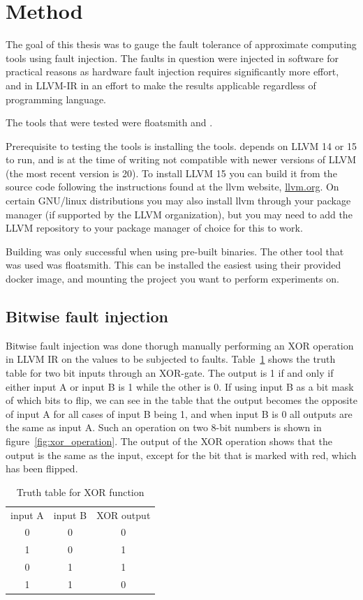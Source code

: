 \section{Method}

The goal of this thesis was to gauge the fault tolerance of approximate computing tools using fault injection. The faults in question were injected in software for practical reasons as hardware fault injection requires significantly more effort, and in LLVM-IR in an effort to make the results applicable regardless of programming language.

The tools that were tested were floatsmith and \taffo{}.

Prerequisite to testing the tools is installing the tools. \taffo{} depends on LLVM 14 or 15 to run, and is at the time of writing not compatible with newer versions of LLVM (the most recent version is 20). To install LLVM 15 you can build it from the source code following the instructions found at the llvm website, \href{llvm.org}{llvm.org}. On certain GNU/linux distributions you may also install llvm through your package manager (if supported by the LLVM organization), but you may need to add the LLVM repository  to your package manager of choice for this to work. 

Building \taffo{} was only successful when using pre-built binaries. 
The other tool that was used was floatsmith. This can be installed the easiest using their provided docker image, and mounting the project you want to perform experiments on.

\subsection{Bitwise fault injection}
Bitwise fault injection was done thorugh manually performing an XOR operation in LLVM IR on the values to be subjected to faults. Table~\ref{table:xor_truth_table} shows the truth table for two bit inputs through an XOR-gate. The output is 1 if and only if either input A or input B is 1 while the other is 0. If using input B as a bit mask of which bits to flip, we can see in the table that the output becomes the opposite of input A for all cases of input B being 1, and when input B is 0 all outputs are the same as input A. Such an operation on two 8-bit numbers is shown in figure~\ref{fig:xor_operation}. The output of the XOR operation shows that the output is the same as the input, except for the bit that is marked with red, which has been flipped.

\begin{table}[htb]
    \centering
\caption{Truth table for XOR function}
    \label{table:xor_truth_table}
\begin{tabular}{c|c|c}\label{table:xor_truth_table}
     input A& input B& XOR output \\
     0&0&0\\
     1&0&1\\
     0&1&1\\
     1&1&0
\end{tabular}
    
\end{table}



